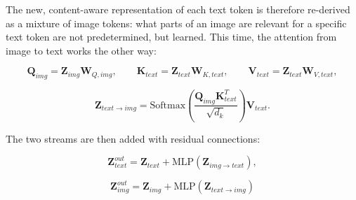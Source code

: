 \documentclass[10pt,twoside]{article}
\begin{document}
The new, content-aware representation of each text token is therefore re-derived as a mixture of image tokens: what parts of an image are relevant for a specific text token are not predetermined, but learned. This time, the attention from image to text works the other way:

\begin{equation}\label{eq:14}
\mathbf{Q}_{img} = \mathbf{Z}_{img} \mathbf{W}_{Q,img}, \qquad \mathbf{K}_{text} = \mathbf{Z}_{text} \mathbf{W}_{K,text}, \qquad \mathbf{V}_{text} = \mathbf{Z}_{text} \mathbf{W}_{V,text},
\end{equation}

\begin{equation}\label{eq:15}
\mathbf{Z}_{text \rightarrow img} = \text{Softmax}\!\left( \frac{\mathbf{Q}_{img} \mathbf{K}_{text}^{T}}{\sqrt{d_k}} \right) \mathbf{V}_{text}.
\end{equation}

The two streams are then added with residual connections:

\begin{equation}\label{eq:16}
\mathbf{Z}_{text}^{out} = \mathbf{Z}_{text} + \text{MLP}\! \left(\mathbf{Z}_{img\rightarrow text}\right),
\end{equation}

\begin{equation}\label{eq:17}
\mathbf{Z}_{img}^{out} = \mathbf{Z}_{img} + \text{MLP}\!\left(\mathbf{Z}_{text \rightarrow img}\right)
\end{equation}
\end{document}
